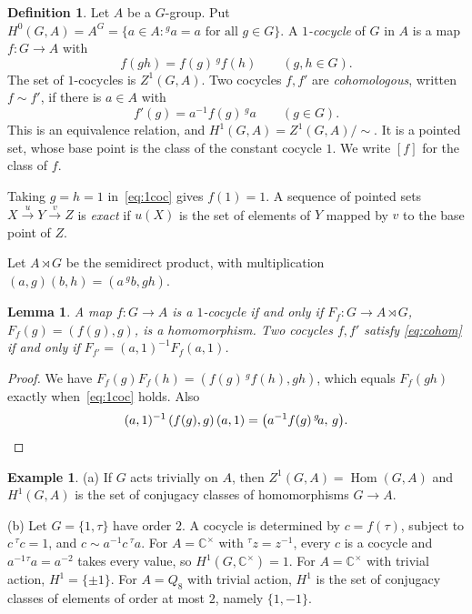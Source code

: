 \documentclass[12pt,letterpaper]{article}
\numberwithin{equation}{section}
\theoremstyle{plain}
\newtheorem{lemma}[theorem]{Lemma}
\theoremstyle{definition}
\newtheorem{definition}[theorem]{Definition}
\newtheorem{example}[theorem]{Example}
\newcommand{\C}{\mathbb{C}}
\newcommand{\act}[2]{{}^{#1}\!#2}          %
\DeclareMathOperator{\Hom}{Hom}
\begin{document}
\begin{definition}\label{def:H1}
Let $A$ be a $G$-group. Put $H^0(G,A)=A^G=\{a\in A:\act{g}{a}=a
\text{ for all } g\in G\}$. A \emph{$1$-cocycle} of $G$ in $A$ is a map
$f:G\to A$ with
\begin{equation}\label{eq:1coc}
f(gh)=f(g)\,\act{g}{f(h)}\qquad (g,h\in G).
\end{equation}
The set of $1$-cocycles is $Z^1(G,A)$. Two cocycles $f,f'$ are
\emph{cohomologous}, written $f\sim f'$, if there is $a\in A$ with
\begin{equation}\label{eq:cohom}
f'(g)=a^{-1}f(g)\,\act{g}{a}\qquad (g\in G).
\end{equation}
This is an equivalence relation, and $H^1(G,A)=Z^1(G,A)/\!\sim$. It is a
pointed set, whose base point is the class of the constant cocycle $1$. We
write $[f]$ for the class of $f$.
\end{definition}

Taking $g=h=1$ in~\eqref{eq:1coc} gives $f(1)=1$. A sequence of pointed
sets $X\overset{u}{\to}Y\overset{v}{\to}Z$ is \emph{exact} if $u(X)$ is the
set of elements of $Y$ mapped by $v$ to the base point of $Z$.

Let $A\rtimes G$ be the semidirect product, with multiplication
$(a,g)(b,h)=(a\,\act{g}{b},gh)$.

\begin{lemma}\label{lem:semidirect}
A map $f:G\to A$ is a $1$-cocycle if and only if $F_f:G\to A\rtimes G$,
$F_f(g)=(f(g),g)$, is a homomorphism. Two cocycles $f,f'$ satisfy
\eqref{eq:cohom} if and only if $F_{f'}=(a,1)^{-1}F_f(a,1)$.
\end{lemma}

\begin{proof}
We have $F_f(g)F_f(h)=(f(g)\,\act{g}{f(h)},gh)$, which equals $F_f(gh)$
exactly when~\eqref{eq:1coc} holds. Also
\[
(a,1)^{-1}\,(f(g),g)\,(a,1)=\bigl(a^{-1}f(g)\,\act{g}{a},\,g\bigr).\qedhere
\]
\end{proof}

\begin{example}\label{ex:H1}
(a) If $G$ acts trivially on $A$, then $Z^1(G,A)=\Hom(G,A)$ and $H^1(G,A)$
is the set of conjugacy classes of homomorphisms $G\to A$.

(b) Let $G=\{1,\tau\}$ have order $2$. A cocycle is determined by
$c=f(\tau)$, subject to $c\,\act{\tau}{c}=1$, and $c\sim a^{-1}c\,
\act{\tau}{a}$. For $A=\C^\times$ with $\act{\tau}{z}=z^{-1}$, every $c$ is
a cocycle and $a^{-1}\act{\tau}{a}=a^{-2}$ takes every value, so
$H^1(G,\C^\times)=1$. For $A=\C^\times$ with trivial action,
$H^1=\{\pm1\}$. For $A=Q_8$ with trivial action, $H^1$ is the set of
conjugacy classes of elements of order at most $2$, namely $\{1,-1\}$.
\end{example}
\end{document}
